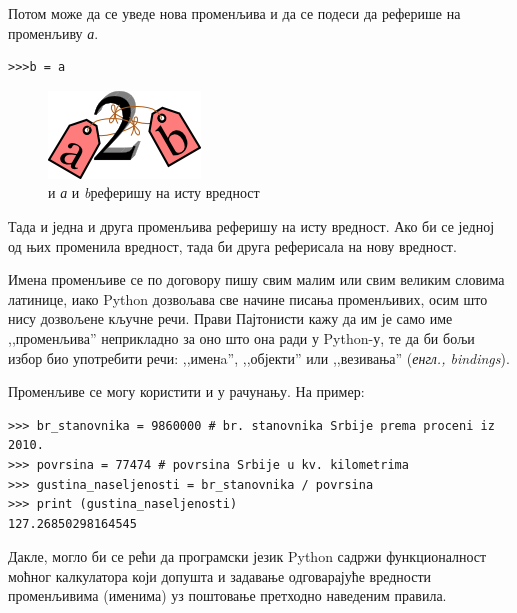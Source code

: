 Потом може да се уведе нова променљива и да се подеси да реферише на променљиву \emph{а}.

\begin{lstlisting}
>>>b = a
\end{lstlisting}

\begin{figure} [here]
\centering
\includegraphics{2ab.png}
\caption{и \emph{а} и \emph{b}реферишу на исту вредност}
\label{slike:a_b_je_2}
\end{figure}

Тада и једна и друга променљива реферишу на исту вредност. Ако би се једној од њих променила вредност, тада би друга реферисала на нову вредност.

Имена променљиве се по договору пишу свим малим или свим великим словима латинице, иако Python дозвољава све начине писања променљивих, осим што нису дозвољене кључне речи. Прави Пајтонисти\cite{pythonista} кажу да им је само име ,,променљива'' неприкладно за оно што она ради у Python-у, те да би бољи избор био употребити речи: ,,именa'',  ,,објекти'' или ,,везивања'' (\emph{енгл., bindings}).

Променљиве се могу користити и у рачунању. На пример:

\begin{lstlisting}[caption = Пример коришћења променљивих, label = variables]
>>> br_stanovnika = 9860000 # br. stanovnika Srbije prema proceni iz 2010.
>>> povrsina = 77474 # povrsina Srbije u kv. kilometrima
>>> gustina_naseljenosti = br_stanovnika / povrsina
>>> print (gustina_naseljenosti)
127.26850298164545
\end{lstlisting}

Дакле, могло би се рећи да програмски језик Python садржи функционалност моћног калкулатора који допушта и задавање одговарајуће вредности променљивима (именима) уз поштовање претходно наведеним правила.
